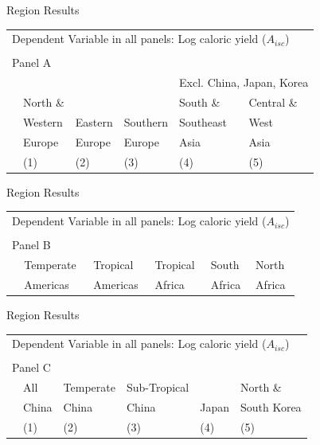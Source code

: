 \documentclass[10pt, xcolor=dvipsnames]{beamer}
\begin{document}
\begin{frame}{Region Results}\label{subregiontab}

{\footnotesize
\begin{tabularx}{\textwidth}{lXXXXX}
\midrule
\multicolumn{6}{l}{Dependent Variable in all panels: Log caloric yield ($A_{isc}$)} \\ \\
\multicolumn{6}{l}{Panel A} \\
 &          &         &             &  \multicolumn{2}{c}{Excl. China, Japan, Korea} \\ \cmidrule(lr){5-6}
 & North \& &         &              & South \&  & Central \&             \\
 & Western  & Eastern & Southern     & Southeast & West        \\
 & Europe   & Europe  & Europe       & Asia      & Asia      \\
 & (1) & (2) & (3) & (4) & (5) \\
\midrule

\midrule
\end{tabularx}
}

\hfill \hyperlink{robustness}{}
\end{frame}

\begin{frame}{Region Results}

{\footnotesize
\begin{tabularx}{\textwidth}{lXXXXX}
\midrule
\multicolumn{6}{l}{Dependent Variable in all panels: Log caloric yield ($A_{isc}$)} \\ \\
\multicolumn{6}{l}{Panel B} \\
 & Temperate & Tropical  & Tropical & South    & North    \\
 & Americas  & Americas  & Africa   & Africa   & Africa     \\
\midrule

\midrule
\end{tabularx}
}

\end{frame}

\begin{frame}{Region Results}

{\footnotesize
\begin{tabularx}{\textwidth}{lXXXXX}
\midrule
\multicolumn{6}{l}{Dependent Variable in all panels: Log caloric yield ($A_{isc}$)} \\ \\
\multicolumn{6}{l}{Panel C} \\
 & All& Temperate & Sub-Tropical & & North \& \\
 & China & China  & China & Japan & South Korea  \\
 & (1) & (2) & (3) & (4) & (5) \\
\midrule

\midrule
\end{tabularx}
}

\end{frame}
\end{document}
